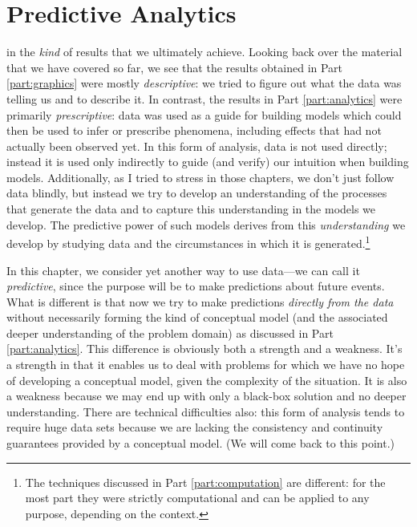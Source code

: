 

\chapter{Predictive Analytics}{}{}
\label{ch:prediction}



 
 in the \emph{kind} of results that
we ultimately achieve. Looking back over the material that we have
covered so far, we see that the results obtained in Part
\ref{part:graphics} were mostly \emph{descriptive}: we tried to figure
out what the data was telling us and to describe it. In contrast, the
results in Part \ref{part:analytics} were primarily
\emph{prescriptive}: data was used as a guide for building models
which could then be used to infer or prescribe phenomena, including
effects that had not actually been observed yet.  In this form of
analysis, data is not used directly; instead it is used only
indirectly to guide (and verify) our intuition when building models.
Additionally, as I tried to stress in those chapters, we don't just
follow data blindly, but instead we try to develop an understanding of
the processes that generate the data and to capture this understanding
in the models we develop. The predictive power of such models derives
from this \emph{understanding} we develop by studying data and the
circumstances in which it is generated.\footnote{The techniques
  discussed in Part \ref{part:computation} are different: for the most
  part they were strictly computational and can be applied to any
  purpose, depending on the context.}

In this chapter, we consider yet another way to use data---we can call
it \emph{predictive}, since the purpose will be to make predictions
about future events. What is different is that now we try to make
predictions \emph{directly from the data} without necessarily forming
the kind of conceptual model (and the associated deeper understanding
of the problem domain) as discussed in Part \ref{part:analytics}.
This difference is obviously both a strength and a  weakness. It's a
strength in that it enables us to deal with problems for which we have
no hope of developing a conceptual model, given the complexity of the
situation. It is also a weakness because we may end up with only a
black-box solution\vadjust{\pagebreak} and no deeper understanding.  There are technical
difficulties also: this form of analysis tends to require huge 
data sets because we are lacking the consistency and continuity
guarantees provided by a conceptual model. (We will come back to this
point.)


